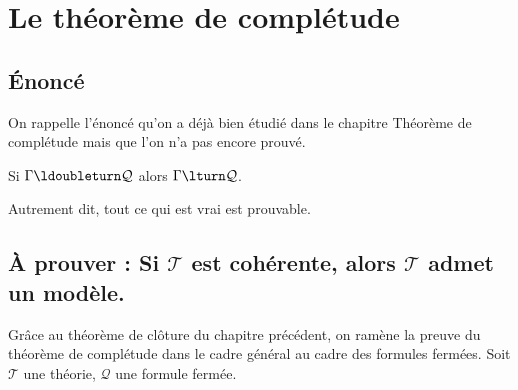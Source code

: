 \documentclass[11pt,class=report,crop=false]{standalone}
\begin{document}










\section{Le théorème de complétude}

\subsection{Énoncé}

On rappelle l'énoncé qu'on a déjà bien étudié dans le chapitre \og{}Théorème de complétude\fg{} mais que l'on n'a pas encore prouvé.
\begin{theoreme}
	Si $\Gamma \ldoubleturn \mathcal{Q}$ alors $\Gamma \lturn \mathcal{Q}$.
\end{theoreme}

Autrement dit, tout ce qui est vrai est prouvable.


\subsection{À prouver : \og{}Si $\mathcal{T}$ est cohérente, alors $\mathcal{T}$ admet un modèle.\fg{}}

Grâce au théorème de clôture du chapitre précédent, on ramène la preuve du théorème de complétude dans le cadre général au cadre des formules fermées.
Soit $\mathcal{T}$ une théorie, $\mathcal{Q}$ une formule fermée.
\end{document}
